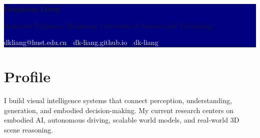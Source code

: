 \documentclass[a4paper,11pt]{article}
\begin{document}
\colorbox{navy}{%
  \begin{minipage}[c][3.15cm][c]{\textwidth}
    \hspace{0.62cm}%
    \begin{minipage}{\dimexpr\textwidth-1.24cm\relax}
      {\fontsize{29}{32}\selectfont\bfseries\color{white} Dingkang Liang}\par
      \vspace{0.16cm}
      {\large\color{white} Assistant Professor, Huazhong University of Science and Technology}\par
      \vspace{0.34cm}
      {\color{white}
        \href{mailto:dkliang@hust.edu.cn}{\textcolor{white}{\faEnvelope\quad dkliang@hust.edu.cn}}
        \hspace{1.25em}\textcolor{line}{|}\hspace{1.25em}
        \href{https://dk-liang.github.io/}{\textcolor{white}{\faGlobe\quad dk-liang.github.io}}
        \hspace{1.25em}\textcolor{line}{|}\hspace{1.25em}
        \href{https://github.com/dk-liang}{\textcolor{white}{\faGithub\quad dk-liang}}
      }
    \end{minipage}
  \end{minipage}%
}

\vspace{0.9em}
\section{Profile}
I build visual intelligence systems that connect perception, understanding, generation, and embodied decision-making. My current research centers on embodied AI, autonomous driving, scalable world models, and real-world 3D scene reasoning.

\vspace{0.45em}
\end{document}

